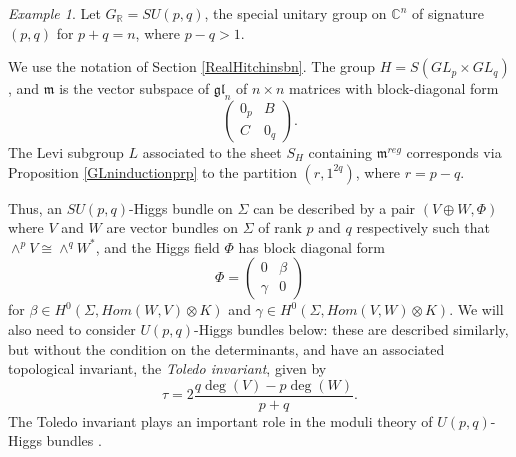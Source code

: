 \documentclass{amsart}
\theoremstyle{remark}
\newtheorem{example}[theorem]{Example}
\numberwithin{theorem}{section}
\numberwithin{equation}{section}
\begin{document}
\begin{example}\label{SUpqAbnexm}
    Let $G_{\mathbb{R}} = SU(p,q)$, the special unitary group on $\mathbb{C}^n$ of signature $(p,q)$ for $p+q=n$, where $p-q>1$.
    
    We use the notation of Section \ref{RealHitchinsbn}. The group $H = S(GL_p \times GL_q)$, and $\mathfrak{m}$ is the vector subspace of $\mathfrak{gl}_n$ of $n \times n$ matrices with block-diagonal form
    \begin{equation}\label{SUpqMeqn}
        \begin{pmatrix}
        0_p & B \\
        C & 0_q
    \end{pmatrix}.
    \end{equation}
     The Levi subgroup $L$ associated to the sheet $S_H$ containing $\mathfrak{m}^{reg}$ corresponds via Proposition \ref{GLninductionprp} to the partition $(r, 1^{2q})$, where $r = p-q$.

     Thus, an $SU(p,q)$-Higgs bundle on $\Sigma$ can be described by a pair $(V \oplus W,\Phi)$ where $V$ and $W$ are vector bundles on $\Sigma$ of rank $p$ and $q$ respectively such that $\wedge^p V \cong \wedge^q W^*$, and the Higgs field $\Phi$ has block diagonal form
        \begin{equation}
    \Phi = \begin{pmatrix}
        0 & \beta \\
        \gamma & 0
    \end{pmatrix}
\end{equation}
for $\beta \in H^0(\Sigma,Hom(W,V) \otimes K)$ and $\gamma \in H^0(\Sigma,Hom(V,W) \otimes K)$. We will also need to consider $U(p,q)$-Higgs bundles below: these are described similarly, but without the condition on the determinants, and have an associated topological invariant, the \emph{Toledo invariant}, given by
\begin{equation}\label{ToledoInvteqn}
    \tau = 2\frac{q\deg(V)-p\deg(W)}{p+q}.
\end{equation}
The Toledo invariant plays an important role in the moduli theory of $U(p,q)$-Higgs bundles \cite{BGPG}.


\end{example}
\end{document}
